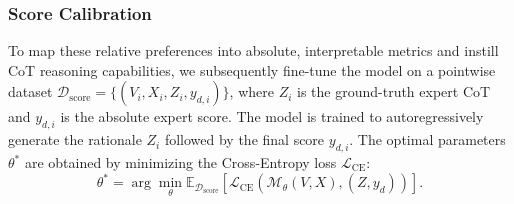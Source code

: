 \documentclass{article}
\begin{document}
\subsubsection{Score Calibration} 
To map these relative preferences into absolute, interpretable metrics and instill CoT reasoning capabilities, we subsequently fine-tune the model on a pointwise dataset $\mathcal{D}_{\text{score}} = \{ (V_i, X_i, Z_i, y_{d,i}) \}$, where $Z_i$ is the ground-truth expert CoT and $y_{d,i}$ is the absolute expert score. The model is trained to autoregressively generate the rationale $Z_i$ followed by the final score $y_{d,i}$. The optimal parameters $\theta^*$ are obtained by minimizing the Cross-Entropy loss $\mathcal{L}_{\text{CE}}$:
\begin{equation}
    \theta^* = \arg\min_{\theta} \mathbb{E}_{\mathcal{D}_{\text{score}}} \left[ \mathcal{L}_{\text{CE}} \left( \mathcal{M}_{\theta}(V, X), (Z, y_d) \right) \right].
\end{equation}





\end{document}
